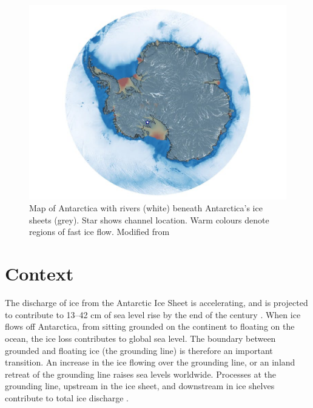 \label{ch:intro}

\begin{figure}[!ht]
\centering
\includegraphics[width=1\textwidth]{chapters/1/antarctica.png}
\caption[Ross Ice Shelf Circulation Schematic]{ Map of Antarctica with rivers (white) beneath Antarctica’s ice sheets (grey). Star shows channel location. Warm colours denote regions of fast ice flow. Modified from \cite{horgan2022channel} }
\label{fig:antarctica}
\end{figure}  

\section{Context} \label{sec:context}

The discharge of ice from the Antarctic Ice Sheet is accelerating, and is projected to contribute to 13--42 cm of sea level rise by the end of the century \citep{edwards2021projected}.
When ice flows off Antarctica, from sitting grounded on the continent to floating on the ocean, the ice loss contributes to global sea level. The boundary between grounded and floating ice (the grounding line) is therefore an important transition. An increase in the ice flowing over the grounding line, or an inland retreat of the grounding line raises sea levels worldwide. Processes at the grounding line, upstream in the ice sheet, and downstream in ice shelves contribute to total ice discharge \citep{rignot2011ice}. 


